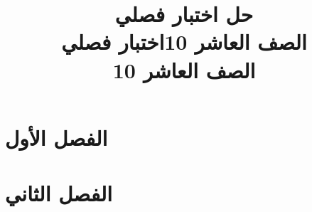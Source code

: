 \documentclass[14pt]{extarticle}
\title{حل اختبار فصلي \\ الصف العاشر 10}
\title{اختبار فصلي \\ الصف العاشر 10}
\begin{document}
\maketitle
\thispagestyle{fancy}


\section{الفصل الأول}


% 
% 

\section{الفصل الثاني}
% 



% 
\end{document}
